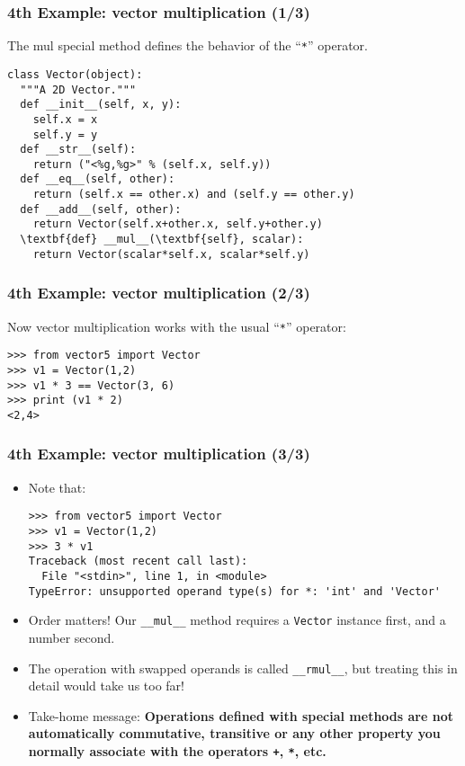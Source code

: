 \begin{frame}[fragile]\frametitle{4th Example: vector multiplication (1/3)}
      The mul special method defines the behavior of
      the ``\texttt{*}'' operator.
\begin{lstlisting}
class Vector(object):
  """A 2D Vector."""
  def __init__(self, x, y):
    self.x = x
    self.y = y
  def __str__(self):
    return ("<%g,%g>" % (self.x, self.y))
  def __eq__(self, other):
    return (self.x == other.x) and (self.y == other.y)
  def __add__(self, other):
    return Vector(self.x+other.x, self.y+other.y)
  \textbf{def} __mul__(\textbf{self}, scalar):
    return Vector(scalar*self.x, scalar*self.y)
\end{lstlisting}
\end{frame}

\begin{frame}[fragile]\frametitle{4th Example: vector multiplication (2/3)}
  Now vector multiplication works with the usual ``\texttt{*}'' operator:
\begin{lstlisting}
>>> from vector5 import Vector
>>> v1 = Vector(1,2)
>>> v1 * 3 == Vector(3, 6)
>>> print (v1 * 2)
<2,4>
\end{lstlisting}
\end{frame}

\begin{frame}[fragile]\frametitle{4th Example: vector multiplication (3/3)}
\begin{itemize}
\item   

  Note that:
\begin{lstlisting}[basicstyle=\ttfamily\scriptsize]
>>> from vector5 import Vector
>>> v1 = Vector(1,2)
>>> 3 * v1
Traceback (most recent call last):
  File "<stdin>", line 1, in <module>
TypeError: unsupported operand type(s) for *: 'int' and 'Vector'
\end{lstlisting}

\item  Order matters! Our \texttt{\_\_mul\_\_} method requires a \texttt{Vector} instance first, and a number second.

\item  The operation with swapped operands is called \texttt{\_\_rmul\_\_}, but treating this in detail would take us too far!

\item Take-home message: \textbf{Operations defined with special
    methods are not automatically commutative, transitive or any other
    property you normally associate with the operators \texttt{+},
    \texttt{*}, etc.}
\end{itemize}    
\end{frame}

